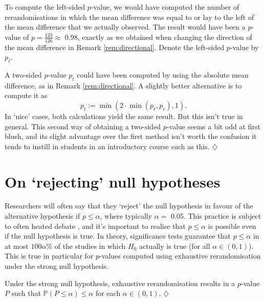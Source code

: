 \documentclass[a4paper]{tufte-book}\usepackage[]{graphicx}\usepackage[]{xcolor}
\newcommand*{\parend}[1][$\diamondsuit$]{%
  \unskip\nobreak\hspace{1em plus 1fill}$\diamondsuit$%
}
\begin{document}
  To compute the left-sided $p$-value, we would have computed
  the number of rerandomisations in which the mean difference was equal to
  or lay to the left of the mean difference that we actually observed.
  The result would have been a $p$-value of $p = \frac{123}{126} \approx$ 0.98,
  exactly as we obtained when changing the direction of the mean difference
  in Remark \ref{rem:directional}.
  Denote the left-sided $p$-value by $p_{\ell}$.
  
  A two-sided $p$-value $p_t$ could have been computed by using the absolute 
  mean difference, as in Remark \ref{rem:directional}.
  A slightly better alternative is to compute it as
  \[
    p_t := \min(2 \cdot \min(p_{\ell}, p_r), 1).
  \]
  In `nice' cases, both calculations yield the
  same result. But this isn't true in general.
  This second way of obtaining a two-sided $p$-value 
  seems a bit odd at first blush,
  and its slight advantage over the first method isn't worth
  the confusion it tends to instill in students in an introductory course
  such as this.
\parend
  
\section{On `rejecting' null hypotheses}
Researchers will often say that they `reject' the null hypothesis in
favour of the alternative hypothesis if $p \leq \alpha$, where typically $\alpha =$ 0.05.
This practice is subject to often heated debate \citep[see][]{McShane2017},
and it's important to realise that $p \leq \alpha$ is possible
even if the null hypothesis is true.
In theory, 
significance tests guarantee that 
$p \leq \alpha$ in at most 
$100\alpha$\% of the studies in which 
$H_0$ actually is true (for all $\alpha \in (0, 1)$).
This is true in particular for $p$-values 
computed using exhaustive rerandomisation under the strong null hypothesis.

\label{lemma:boundpval}
  Under the strong null hypothesis, 
  exhaustive rerandomisation results in a $p$-value $P$
  such that $\mathbb{P}(P \leq \alpha) \leq \alpha$ for each $\alpha \in (0, 1)$.
\parend
\end{document}

